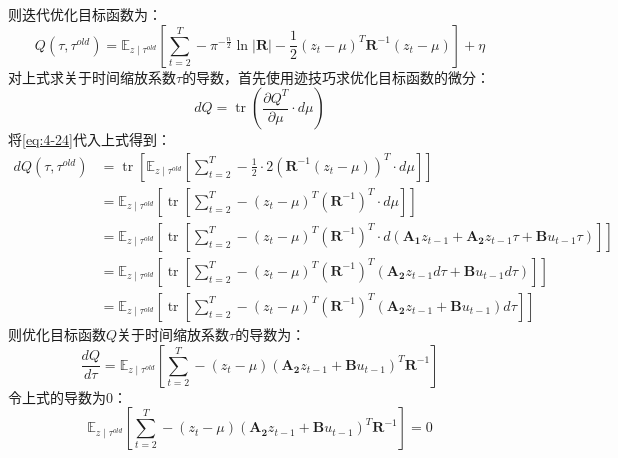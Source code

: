 则迭代优化目标函数为：
\begin{equation}
    Q\left(\tau, \tau^{old}\right)
    =\mathbb{E}_{z \mid \tau^{old}}\left[\sum_{t=2}^T-\pi^{-\frac{n}{2}}\ln\mathbf{|R|}-\frac{1}{2}\left(z_t-\mu\right)^T \mathbf{R}^{-1}\left(z_t-\mu\right)\right] + \eta
    \label{eq:4-24}
\end{equation}
对上式求关于时间缩放系数$\tau$的导数，首先使用迹技巧求优化目标函数的微分：
\begin{equation}
    d Q=\operatorname{tr}\left(\frac{\partial Q^T}{\partial \mu} \cdot d \mu\right)
    \label{eq:4-25}
\end{equation}
将\ref{eq:4-24}代入上式得到：
\begin{equation}
    \begin{aligned}
    d Q\left(\tau, \tau^{old}\right)
    & =\operatorname{tr}\left[\mathbb{E}_{z \mid \tau^{old}}\left[\sum_{t=2}^T-\frac{1}{2} \cdot 2 \left(\mathbf{R}^{-1}\left(z_t-\mu\right)\right)^T \cdot d \mu\right]\right] \\
    & =\mathbb{E}_{z \mid \tau^{old}}\left[\operatorname{tr}\left[\sum_{t=2}^T-\left(z_t-\mu\right)^T \left(\mathbf{R}^{-1}\right)^T \cdot d \mu\right]\right] \\
    & =\mathbb{E}_{z \mid \tau^{old}}\left[\operatorname{tr}\left[\sum_{t=2}^T-\left(z_t-\mu\right)^T \left(\mathbf{R}^{-1}\right)^T \cdot d\left(\mathbf{A_1} z_{t-1}+\mathbf{A_2} z_{t-1} \tau+\mathbf{B} u_{t-1} \tau\right)\right]\right] \\
    & =\mathbb{E}_{z \mid \tau^{old}}\left[\operatorname{tr}\left[\sum_{t=2}^T-\left(z_t-\mu\right)^T \left(\mathbf{R}^{-1}\right)^T\left(\mathbf{A_2}z_{t-1} d \tau+\mathbf{B} u_{t-1} d \tau\right)\right]\right] \\
    & =\mathbb{E}_{z \mid \tau^{old}}\left[\operatorname{tr}\left[\sum_{t=2}^T-\left(z_t-\mu\right)^T \left(\mathbf{R}^{-1}\right)^T(\mathbf{A_2} z_{t-1}+\mathbf{B} u_{t-1}) d \tau \right]\right]
    \end{aligned}
    \label{eq:4-26}
\end{equation}
则优化目标函数$Q$关于时间缩放系数$\tau$的导数为：
\begin{equation}
    \frac{d Q}{d \tau}=\mathbb{E}_{z \mid \tau^{old}}\left[\sum_{t=2}^T -\left(z_t-\mu\right)\left(\mathbf{A_2} z_{t-1}+\mathbf{B} u_{t-1}\right)^T\mathbf{R}^{-1}\right]
    \label{eq:4-27}
\end{equation}
令上式的导数为0：
\begin{equation}
    \mathbb{E}_{z \mid \tau^{old}}\left[\sum_{t=2}^T -\left(z_t-\mu\right)\left(\mathbf{A_2} z_{t-1}+\mathbf{B} u_{t-1}\right)^T\mathbf{R}^{-1}\right] = 0
    \label{eq:4-28}
\end{equation}
